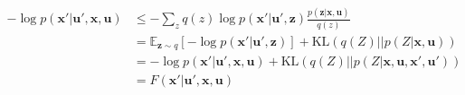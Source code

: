 \documentclass[12pt,twoside,openright]{article}
\begin{document}
\begin{align}
-\log p(\boldsymbol{x}'| \boldsymbol{u}', \boldsymbol{x}, \boldsymbol{u}) 
&\leq - \sum_z q(z) \log p(\boldsymbol{x}'| \boldsymbol{u}', \boldsymbol{z}) \frac{p(\boldsymbol{z} |\boldsymbol{x}, \boldsymbol{u})} {q(z)}  \nonumber\\
&= \mathbb{E}_{\boldsymbol{z} \sim q} \left[-\log p(\boldsymbol{x}'| \boldsymbol{u}', \boldsymbol{z})\right] + \text{KL}(q(Z)||p(Z|\boldsymbol{x},\boldsymbol{u}))
\label{eq:FEP-uxu}\\
&=  -\log p(\boldsymbol{x}'| \boldsymbol{u}', \boldsymbol{x},\boldsymbol{u}) + \text{KL}(q(Z)||p(Z|\boldsymbol{x},\boldsymbol{u},\boldsymbol{x}',\boldsymbol{u}'))
\label{eq:FEP-uxu2}\\
&= F(\boldsymbol{x}'|\boldsymbol{u}', \boldsymbol{x}, \boldsymbol{u})\nonumber
\end{align}
\end{document}
